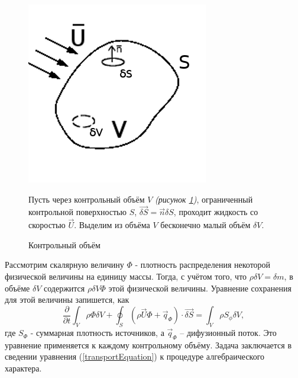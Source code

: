 		\begin{figure}[h]
			\vspace{-2em}
			\begin{minipage}{0.43\linewidth}
				\includegraphics[scale=0.5]{controlVolume}
				\vspace{-2em}
				\caption{Контрольный объём}
				\label{fig:volume}
			\end{minipage}
			\hspace{-1em}
			\begin{minipage}{0.6\linewidth}
				\vspace{-1em}
				Пусть через контрольный объём $V$ \textit{(рисунок \ref{fig:volume})}, ограниченный контрольной поверхностью $S$, $\vec{\delta S} = \vec{n} \delta S$, проходит жидкость со скоростью $\vec{U}$. Выделим из объёма $V$ бесконечно малый объём $\delta V$. 
			\end{minipage}
		\end{figure}
		\vspace{-1em}
		Рассмотрим скалярную величину $\Phi$ - плотность распределения некоторой физической величины на единицу массы. Тогда, с учётом того, что $\rho \delta V = \delta m$, в объёме $\delta V$ содержится $\rho \delta V \Phi$ этой физической величины. Уравнение сохранения для этой величины запишется, как
		\begin{equation}
			\frac{\partial}{\partial t} \int_V \rho \Phi \delta V + \oint_S \left( \rho \vec{U} \Phi + \vec{q}_{\Phi}  \right)\cdot \vec{\delta S} = \int_V \rho S_{\phi} \delta V,
			\label{transportEquation}
		\end{equation}
		где $S_{\Phi}$ - суммарная плотность источников, а $\vec{q}_{\Phi}$ -- дифузионный поток. Это уравнение применяется к каждому контрольному объёму. Задача заключается в сведении уравнения (\ref{transportEquation}) к процедуре алгебраического характера.
		
